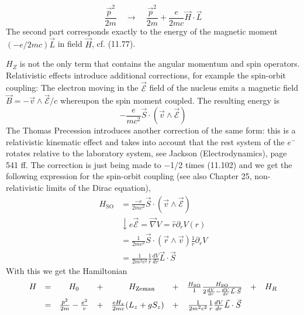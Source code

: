 \begin{equation}
    \frac{\vec{p}^{2}}{2 m} \quad \rightarrow \quad \frac{\vec{p}^{2}}{2 m}+\frac{e}{2 m c} \vec{H} \cdot \vec{L}
    \end{equation}
The second part corresponds exactly to the energy of the magnetic moment $(−e / 2mc)\vec{L}$ in field $\vec{H}$, cf. (11.77).\par
$H_Z$ is not the only term that contains the angular momentum and spin operators. Relativistic effects introduce additional corrections, for example the spin-orbit coupling: The electron moving in the $\vec{\mathcal{E}}$ field of the nucleus emits a magnetic field $\vec{B}=-\vec{v} \wedge \overrightarrow{\mathcal{E}} / c$ whereupon the spin moment coupled. The resulting energy is
\begin{equation}
    -\frac{e}{m c^{2}} \vec{S} \cdot(\vec{v} \wedge \overrightarrow{\mathcal{E}})
    \end{equation}
The Thomas Precession introduces another correction of the same form: this is a relativistic kinematic effect and takes into account that the rest system of the $e^−$ rotates relative to the laboratory system, see Jackson (Electrodynamics), page 541 ff. The correction is just being made to −1/2 times (11.102) and we get the following expression for the spin-orbit coupling (see also Chapter 25, non-relativistic limits of the Dirac equation),
\begin{equation}
\begin{aligned} H_{\mathrm{SO}} &=\frac{-e}{2 m c^{2}} \vec{S} \cdot(\vec{v} \wedge \overrightarrow{\mathcal{E}}) \\ & \downarrow e \overrightarrow{\mathcal{E}}=\vec{\nabla} V=\hat{r} \partial_{r} V(r) \\ &=\frac{1}{2 m c^{2}} \vec{S} \cdot(\vec{r} \wedge \vec{v}) \frac{1}{r} \partial_{r} V \\ &=\frac{1}{2 m^{2} c^{2}} \frac{1}{r} \frac{d V}{d r} \vec{L} \cdot \vec{S} \end{aligned}
\end{equation}
With this we get the Hamiltonian
\begin{equation}
\begin{array}{ccccccccc} 
    H&=&H_{0}&+&\quad H_{\mathrm{Zeman}}&+&\frac{H_{\mathrm{SO}}}{1} \frac{H_{\mathrm{SO}}}{2 \frac{d V}{d r}-\frac{d V}{d r} \vec{L} \cdot \vec{S}} &+& H_R\vspace{1ex}\\ 
    &=&\frac{p^2}{2m}-\frac{e^2}{r}&+&\frac{eH_z}{2mc}(L_z+gS_z)&+&\frac{1}{2m^2c^2}\frac{1}{r}\frac{dV}{dr}\vec{L}\cdot\vec{S}
\end{array}
\end{equation}
